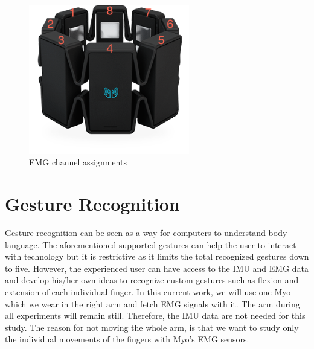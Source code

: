 \begin{figure}[h!]
\includegraphics[width=7cm,center,keepaspectratio]{figures/myo_enum}
\caption{EMG channel assignments}
\label{myo_enum}
\end{figure}

\section{Gesture Recognition} 
Gesture recognition can be seen as a way for computers to understand body language. The aforementioned supported gestures can help the user to interact with technology but it is restrictive as it limits the total recognized gestures down to five. However, the experienced user can have access to the IMU and EMG data and develop his/her own ideas to recognize custom gestures such as flexion and extension of each individual finger. In this current work, we will use one Myo which we wear in the right arm and fetch EMG signals with it. The arm during all experiments will remain still. Therefore, the IMU data are not needed for this study. The reason for not moving the whole arm, is that we want to study only the individual movements of the fingers with Myo's EMG sensors.

